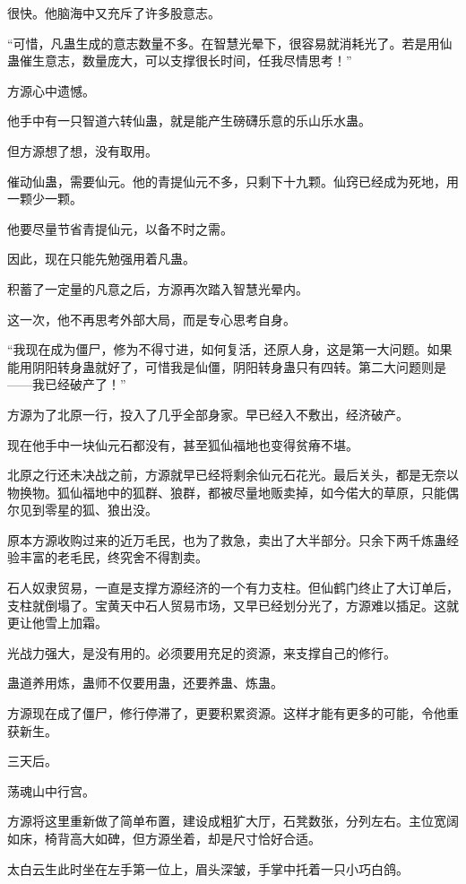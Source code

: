 \begin{this_body}
很快。他脑海中又充斥了许多股意志。

“可惜，凡蛊生成的意志数量不多。在智慧光晕下，很容易就消耗光了。若是用仙蛊催生意志，数量庞大，可以支撑很长时间，任我尽情思考！”

方源心中遗憾。

他手中有一只智道六转仙蛊，就是能产生磅礴乐意的乐山乐水蛊。

但方源想了想，没有取用。

催动仙蛊，需要仙元。他的青提仙元不多，只剩下十九颗。仙窍已经成为死地，用一颗少一颗。

他要尽量节省青提仙元，以备不时之需。

因此，现在只能先勉强用着凡蛊。

积蓄了一定量的凡意之后，方源再次踏入智慧光晕内。

这一次，他不再思考外部大局，而是专心思考自身。

“我现在成为僵尸，修为不得寸进，如何复活，还原人身，这是第一大问题。如果能用阴阳转身蛊就好了，可惜我是仙僵，阴阳转身蛊只有四转。第二大问题则是——我已经破产了！”

方源为了北原一行，投入了几乎全部身家。早已经入不敷出，经济破产。

现在他手中一块仙元石都没有，甚至狐仙福地也变得贫瘠不堪。

北原之行还未决战之前，方源就早已经将剩余仙元石花光。最后关头，都是无奈以物换物。狐仙福地中的狐群、狼群，都被尽量地贩卖掉，如今偌大的草原，只能偶尔见到零星的狐、狼出没。

原本方源收购过来的近万毛民，也为了救急，卖出了大半部分。只余下两千炼蛊经验丰富的老毛民，终究舍不得割卖。

石人奴隶贸易，一直是支撑方源经济的一个有力支柱。但仙鹤门终止了大订单后，支柱就倒塌了。宝黄天中石人贸易市场，又早已经划分光了，方源难以插足。这就更让他雪上加霜。

光战力强大，是没有用的。必须要用充足的资源，来支撑自己的修行。

蛊道养用炼，蛊师不仅要用蛊，还要养蛊、炼蛊。

方源现在成了僵尸，修行停滞了，更要积累资源。这样才能有更多的可能，令他重获新生。

三天后。

荡魂山中行宫。

方源将这里重新做了简单布置，建设成粗犷大厅，石凳数张，分列左右。主位宽阔如床，椅背高大如碑，但方源坐着，却是尺寸恰好合适。

太白云生此时坐在左手第一位上，眉头深皱，手掌中托着一只小巧白鸽。


\end{this_body}
